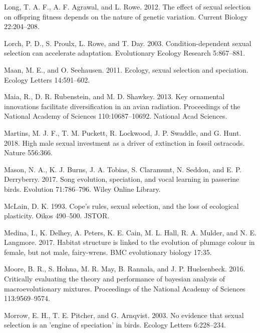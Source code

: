 \documentclass[]{article}
\begin{document}
\leavevmode\hypertarget{ref-Long_2012}{}%
Long, T. A. F., A. F. Agrawal, and L. Rowe. 2012. The effect of sexual
selection on offspring fitness depends on the nature of genetic
variation. Current Biology 22:204--208.

\leavevmode\hypertarget{ref-Lorch_2003}{}%
Lorch, P. D., S. Proulx, L. Rowe, and T. Day. 2003. Condition-dependent
sexual selection can accelerate adaptation. Evolutionary Ecology
Research 5:867--881.

\leavevmode\hypertarget{ref-Maan_2011}{}%
Maan, M. E., and O. Seehausen. 2011. Ecology, sexual selection and
speciation. Ecology Letters 14:591--602.

\leavevmode\hypertarget{ref-Maia_2013}{}%
Maia, R., D. R. Rubenstein, and M. D. Shawkey. 2013. Key ornamental
innovations facilitate diversification in an avian radiation.
Proceedings of the National Academy of Sciences 110:10687--10692.
National Acad Sciences.

\leavevmode\hypertarget{ref-Martins_2018}{}%
Martins, M. J. F., T. M. Puckett, R. Lockwood, J. P. Swaddle, and G.
Hunt. 2018. High male sexual investment as a driver of extinction in
fossil ostracods. Nature 556:366.

\leavevmode\hypertarget{ref-Mason_2017}{}%
Mason, N. A., K. J. Burns, J. A. Tobias, S. Claramunt, N. Seddon, and E.
P. Derryberry. 2017. Song evolution, speciation, and vocal learning in
passerine birds. Evolution 71:786--796. Wiley Online Library.

\leavevmode\hypertarget{ref-Mclain_1993}{}%
McLain, D. K. 1993. Cope's rules, sexual selection, and the loss of
ecological plasticity. Oikos 490--500. JSTOR.

\leavevmode\hypertarget{ref-Medina_2017}{}%
Medina, I., K. Delhey, A. Peters, K. E. Cain, M. L. Hall, R. A. Mulder,
and N. E. Langmore. 2017. Habitat structure is linked to the evolution
of plumage colour in female, but not male, fairy-wrens. BMC evolutionary
biology 17:35.

\leavevmode\hypertarget{ref-Moore_2016}{}%
Moore, B. R., S. Hohna, M. R. May, B. Rannala, and J. P. Huelsenbeck.
2016. Critically evaluating the theory and performance of bayesian
analysis of macroevolutionary mixtures. Proceedings of the National
Academy of Sciences 113:9569--9574.

\leavevmode\hypertarget{ref-Morrow_Speciation_2003}{}%
Morrow, E. H., T. E. Pitcher, and G. Arnqvist. 2003. No evidence that
sexual selection is an 'engine of speciation' in birds. Ecology Letters
6:228--234.
\end{document}
